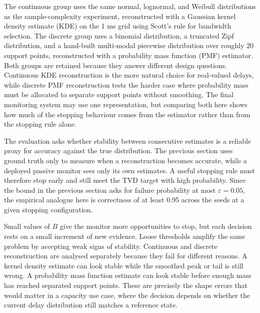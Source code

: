 \documentclass[a4paper,11pt]{report}
\begin{document}
The continuous group uses the same normal, lognormal, and Weibull distributions as the sample-complexity experiment, reconstructed with a Gaussian kernel density estimate (KDE) on the 1 ms grid using Scott's rule for bandwidth selection. The discrete group uses a binomial distribution, a truncated Zipf distribution, and a hand-built multi-modal piecewise distribution over roughly 20 support points, reconstructed with a probability mass function (PMF) estimator. Both groups are retained because they answer different design questions. Continuous KDE reconstruction is the more natural choice for real-valued delays, while discrete PMF reconstruction tests the harder case where probability mass must be allocated to separate support points without smoothing. The final monitoring system may use one representation, but comparing both here shows how much of the stopping behaviour comes from the estimator rather than from the stopping rule alone.

The evaluation asks whether stability between consecutive estimates is a reliable proxy for accuracy against the true distribution. The previous section uses ground truth only to measure when a reconstruction becomes accurate, while a deployed passive monitor sees only its own estimates. A useful stopping rule must therefore stop early and still meet the TVD target with high probability. Since the bound in the previous section asks for failure probability at most \(\varepsilon=0.05\), the empirical analogue here is correctness of at least 0.95 across the seeds at a given stopping configuration.

Small values of \(B\) give the monitor more opportunities to stop, but each decision rests on a small increment of new evidence. Loose thresholds amplify the same problem by accepting weak signs of stability. Continuous and discrete reconstruction are analysed separately because they fail for different reasons. A kernel density estimate can look stable while the smoothed peak or tail is still wrong. A probability mass function estimate can look stable before enough mass has reached separated support points. These are precisely the shape errors that would matter in a capacity use case, where the decision depends on whether the current delay distribution still matches a reference state.
\end{document}

